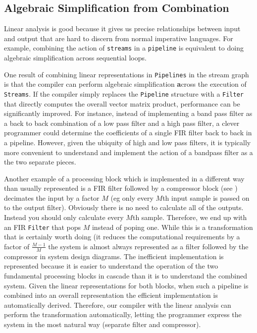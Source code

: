 \subsection{Algebraic Simplification from Combination}
Linear analysis is good because it gives us precise relationships between input and output   
that are hard to discern from normal imperative languages. For example, combining the action
of {\tt streams} in a {\tt pipeline} is equivalent to doing algebraic simplification across
sequential loops. 

One result of combining linear representations in {\tt Pipelines} in the stream graph is that  
the compiler can perform algebraic simplification {\textbf across} the execution of {\tt Streams}. 
If the compiler simply replaces the {\tt Pipeline} structure with a {\tt Filter} that 
directly computes the overall vector matrix product, performance can be significantly improved.
For instance, instead of implementing a band pass filter as a back to back combination
of a low pass filter and a high pass filter, a clever programmer could determine the coefficients 
of a single FIR filter back to back in a pipeline. However, given the ubiquity of high and 
low pass filters, it is typically more convenient to understand and implement the action
of a bandpass filter as a the two separate pieces.

Another example of a processing block which is implemented in a different way than
usually represented is a FIR filter followed by a compressor block 
(see \cite{oppenheim-discrete}) decimates the input by a factor $M$ (eg only every $M$th 
input sample is passed on to the output filter). 
Obviously there is no need to calculate all of the outputs. 
Instead you should only calculate every $M$th sample.
Therefore, we end up with an FIR {\tt Filter} that pops $M$ instead of poping one. While
this is a transformation that is certainly worth doing (it reduces the computational
requirements by a factor of $\frac{M-1}{M}$ the system is almost always represented
as a filter followed by the compressor in system design diagrams. The inefficient
implementation is represented because it is easier to understand the operation of the
two fundamental processing blocks in cascade than it is to understand the combined system.
Given the linear representations for both blocks, when such a pipeline is combined into an
overall representation the efficient implementation is automatically derived. Therefore,
our compiler with the linear analysis can perform the transformation automatically, 
letting the programmer express the system in the most natural way (separate filter and compressor).


